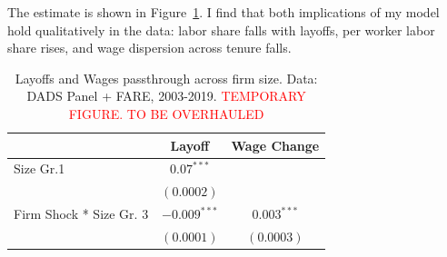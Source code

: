 The estimate is shown in Figure~\ref{tab:layoff_response}. I find that both implications of my model hold qualitatively in the data: labor share falls with layoffs, per worker labor share rises, and wage dispersion across tenure falls.

\begin{table}
  \centering
  \begin{tabular}{lcc}
    \hline
    & \multicolumn{1}{c}{Layoff} & \multicolumn{1}{c}{Wage Change} \\
    \hline
    \vspace{-4pt} 
    Size Gr.1        &  $0.07^{***}$   &      \\    \vspace{-4pt} 
                        &  $(0.0002)$     &       \\    \vspace{-4pt} 
    Firm Shock * Size Gr. 3        & $-0.009^{***}$     &   $0.003^{***}$ \\    \vspace{-4pt} 
                                    &  $(0.0001)$     &    $(0.0003)$ \\  
    \hline
  \end{tabular}
  \caption{Layoffs and Wages passthrough across firm size. Data: DADS Panel + FARE, 2003-2019. \textcolor{red}{TEMPORARY FIGURE. TO BE OVERHAULED}}
  \label{tab:layoff_response}
\end{table}
